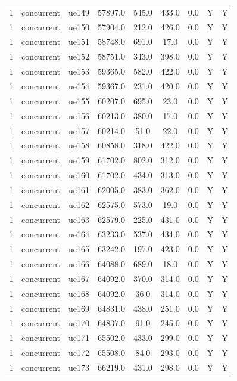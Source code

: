 \begin{table}[ht]
\begin{tabular}{|c|c|c|c|c|c|c|c|c|}
1 & concurrent & ue149 & 57897.0 & 545.0 & 433.0 & 0.0 & Y & Y \\
1 & concurrent & ue150 & 57904.0 & 212.0 & 426.0 & 0.0 & Y & Y \\
1 & concurrent & ue151 & 58748.0 & 691.0 & 17.0 & 0.0 & Y & Y \\
1 & concurrent & ue152 & 58751.0 & 343.0 & 398.0 & 0.0 & Y & Y \\
1 & concurrent & ue153 & 59365.0 & 582.0 & 422.0 & 0.0 & Y & Y \\
1 & concurrent & ue154 & 59367.0 & 231.0 & 420.0 & 0.0 & Y & Y \\
1 & concurrent & ue155 & 60207.0 & 695.0 & 23.0 & 0.0 & Y & Y \\
1 & concurrent & ue156 & 60213.0 & 380.0 & 17.0 & 0.0 & Y & Y \\
1 & concurrent & ue157 & 60214.0 & 51.0 & 22.0 & 0.0 & Y & Y \\
1 & concurrent & ue158 & 60858.0 & 318.0 & 422.0 & 0.0 & Y & Y \\
1 & concurrent & ue159 & 61702.0 & 802.0 & 312.0 & 0.0 & Y & Y \\
1 & concurrent & ue160 & 61702.0 & 434.0 & 313.0 & 0.0 & Y & Y \\
1 & concurrent & ue161 & 62005.0 & 383.0 & 362.0 & 0.0 & Y & Y \\
1 & concurrent & ue162 & 62575.0 & 573.0 & 19.0 & 0.0 & Y & Y \\
1 & concurrent & ue163 & 62579.0 & 225.0 & 431.0 & 0.0 & Y & Y \\
1 & concurrent & ue164 & 63233.0 & 537.0 & 434.0 & 0.0 & Y & Y \\
1 & concurrent & ue165 & 63242.0 & 197.0 & 423.0 & 0.0 & Y & Y \\
1 & concurrent & ue166 & 64088.0 & 689.0 & 18.0 & 0.0 & Y & Y \\
1 & concurrent & ue167 & 64092.0 & 370.0 & 314.0 & 0.0 & Y & Y \\
1 & concurrent & ue168 & 64092.0 & 36.0 & 314.0 & 0.0 & Y & Y \\
1 & concurrent & ue169 & 64831.0 & 438.0 & 251.0 & 0.0 & Y & Y \\
1 & concurrent & ue170 & 64837.0 & 91.0 & 245.0 & 0.0 & Y & Y \\
1 & concurrent & ue171 & 65502.0 & 433.0 & 299.0 & 0.0 & Y & Y \\
1 & concurrent & ue172 & 65508.0 & 84.0 & 293.0 & 0.0 & Y & Y \\
1 & concurrent & ue173 & 66219.0 & 431.0 & 298.0 & 0.0 & Y & Y \\

\end{tabular}
\end{table}
